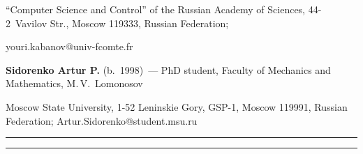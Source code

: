 ``Computer Science and Control'' of the Russian Academy of Sciences, 44-2~Vavilov Str., Moscow 119333, Russian Federation; 

\mbox{youri.kabanov@univ-fcomte.fr}



\vspace*{3pt}



\noindent

\textbf{Sidorenko Artur P.} (b.\ 1998)~--- PhD student, Faculty of Mechanics and Mathematics, M.\,V.~Lomonosov 

Moscow State University, 1-52 Leninskie Gory, GSP-1, Moscow 119991, Russian Federation;  \mbox{Artur.Sidorenko@student.msu.ru}



\vspace*{6pt}



\hrule



\vspace*{2pt}



\hrule



\vspace*{4pt}













\def\tit{АКСИОМАТИЧЕСКИЙ ВЗГЛЯД НА МОДЕЛИ СИСТЕМНОГО РИСКА РОДЖЕРСА--ВЕРААРТ 

И~СУДЗУКИ--ЭЛЬСИНГЕРА$^*$\\[-5pt]}



\def\aut{Ю.\,М.~Кабанов$^{1}$, А.\,П. Сидоренко$^2$}





\def\titkol{Аксиоматический взгляд на модели системного риска Роджерса--Вераарт 

и~Судзуки--Эльсингера}



\def\autkol{Ю.\,М.~Кабанов, А.\,П.~Сидоренко}



{\renewcommand{\thefootnote}{\fnsymbol{footnote}}

}





